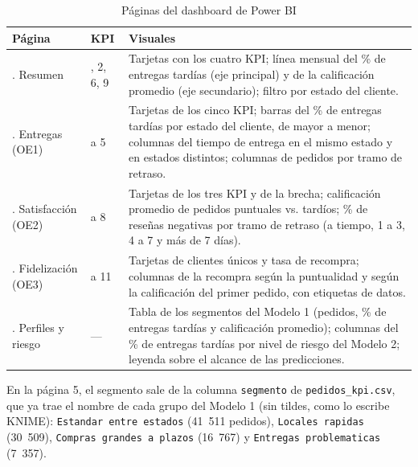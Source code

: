 \documentclass[a4paper,stu,12pt,donotrepeattitle,floatsintext]{apa7}
\begin{document}
{\footnotesize
\begin{longtable}{|>{\raggedright\arraybackslash}p{}|>{\raggedright\arraybackslash}p{}|>{\raggedright\arraybackslash}p{}|}
\caption{Páginas del dashboard de Power BI}\\
\hline
\textbf{Página} & \textbf{KPI} & \textbf{Visuales} \\ \hline
\endhead
1. Resumen & 1, 2, 6, 9 & Tarjetas con los cuatro KPI; línea mensual del \% de entregas tardías (eje principal) y de la calificación promedio (eje secundario); filtro por estado del cliente. \\ \hline
2. Entregas (OE1) & 1 a 5 & Tarjetas de los cinco KPI; barras del \% de entregas tardías por estado del cliente, de mayor a menor; columnas del tiempo de entrega en el mismo estado y en estados distintos; columnas de pedidos por tramo de retraso. \\ \hline
3. Satisfacción (OE2) & 6 a 8 & Tarjetas de los tres KPI y de la brecha; calificación promedio de pedidos puntuales vs. tardíos; \% de reseñas negativas por tramo de retraso (a tiempo, 1 a 3, 4 a 7 y más de 7 días). \\ \hline
4. Fidelización (OE3) & 9 a 11 & Tarjetas de clientes únicos y tasa de recompra; columnas de la recompra según la puntualidad y según la calificación del primer pedido, con etiquetas de datos. \\ \hline
5. Perfiles y riesgo & — & Tabla de los segmentos del Modelo 1 (pedidos, \% de entregas tardías y calificación promedio); columnas del \% de entregas tardías por nivel de riesgo del Modelo 2; leyenda sobre el alcance de las predicciones. \\ \hline
\end{longtable}
}
En la página 5, el segmento sale de la columna \texttt{segmento} de \texttt{pedidos\_\allowbreak{}kpi.csv}, que ya trae el nombre de cada grupo del Modelo 1 (sin tildes, como lo escribe KNIME): \texttt{Estandar entre estados} (41~511 pedidos), \texttt{Locales rapidas} (30~509), \texttt{Compras grandes a plazos} (16~767) y \texttt{Entregas problematicas} (7~357).
\end{document}
